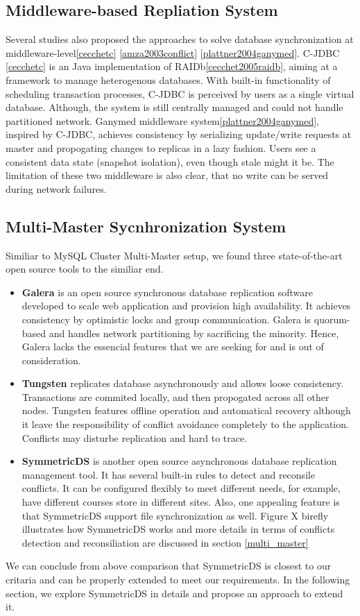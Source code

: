 \subsection{Middleware-based Repliation System}
Several studies also proposed the approaches to solve database synchronization at middleware-level\ref{cecchetc} \ref{amza2003conflict} \ref{plattner2004ganymed}. C-JDBC \ref{cecchetc} is an Java implementation of RAIDb\ref{cecchet2005raidb}, aiming at a framework to manage heterogenous databases. With built-in functionality of scheduling transaction processes, C-JDBC is perceived by users as a single virtual database. Although, the system is still centrally managed and could not handle partitioned network. Ganymed middleware system\ref{plattner2004ganymed}, inspired by C-JDBC, achieves consistency by serializing update/write requests at master and propogating changes to replicas in a lazy fashion. Users see a consistent data state (snapshot isolation), even though stale might it be. The limitation of these two middleware is also clear, that no write can be served during network failures.


\subsection{Multi-Master Sycnhronization System} 
Similiar to MySQL Cluster Multi-Master setup, we found three state-of-the-art open source tools to the similiar end.
\begin{itemize}
\item \textbf{Galera}\cite{galera} is an open source synchronous database replication software developed to scale web application and provision high availability. It achieves consistency by optimistic locks and group communication. Galera is quorum-based and handles network partitioning by sacrificing the minority. Hence, Galera lacks the essencial features that we are seeking for and is out of consideration.
\item \textbf{Tungsten}\cite{tungsten} replicates database asynchronously and allows loose consistency. Transactions are commited locally, and then propogated across all other nodes. Tungsten features offline operation and automatical recovery although it leave the responsibility of conflict avoidance completely to the application. Conflicts may disturbe replication and hard to trace.
\item \textbf{SymmetricDS}\cite{symmetricds} is another open source asynchronous database replication management tool. It has several built-in rules to detect and reconsile conflicts. It can be configured flexibly to meet different needs, for example, have different courses store in different sites. Also, one appealing feature is that SymmetricDS support file synchronization as well. Figure X birefly illustrates how SymmetricDS works and more details in terms of conflicts detection and reconsiliation are discussed in section \ref{multi_master}
\end{itemize}
We can conclude from above comparison that SymmetricDS is closest to our critaria and can be properly extended to meet our requirements. In the following section, we explore SymmetricDS in details and propose an approach to extend it.

